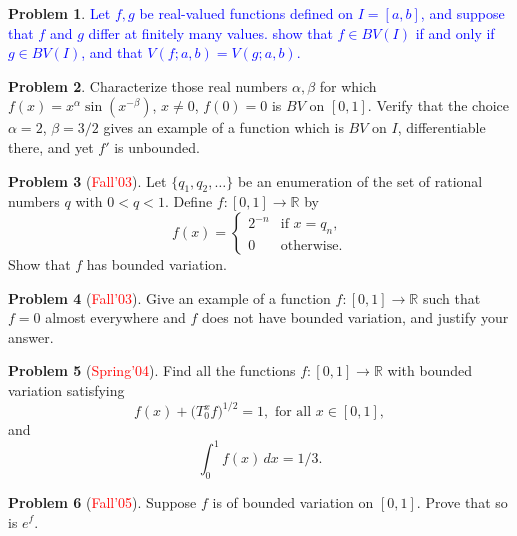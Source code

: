 \documentclass[12pt]{amsart}
\def\field#1{\mathbb{#1}}
\theoremstyle{definition}
\newtheorem{problem}{Problem}
\theoremstyle{remark}
\begin{document}
\begin{problem}
  \textcolor{blue}{Let $f,g$ be real-valued functions defined on
    $I=[a,b]$, and suppose that $f$ and $g$ differ at finitely many
    values.  show that $f \in BV(I)$ if and only if $g \in BV(I)$, and
    that $V(f;a,b) = V(g;a,b)$.}
\end{problem}
\begin{problem}
  Characterize those real numbers $\alpha, \beta$ for which $f(x) =
  x^\alpha \sin(x^{-\beta})$, $x\neq 0$, $f(0)=0$ is $BV$ on $[0,1]$.
  Verify that the choice $\alpha=2$, $\beta=3/2$ gives an example of a
  function which is $BV$ on $I$, differentiable there, and yet $f'$ is
  unbounded.
\end{problem}
\begin{problem}[\textcolor{red}{Fall'03}]
  Let $\{ q_1, q_2, \dotsc \}$ be an enumeration of the set of
  rational numbers $q$ with $0<q<1$. Define $f\colon [0,1] \to
  \field{R}$ by
  \begin{equation*}
    f(x) = \begin{cases}
      2^{-n} &\text{if } x=q_n, \\
      0 &\text{otherwise}.
    \end{cases} 
  \end{equation*}
  Show that $f$ has bounded variation.
\end{problem}
\begin{problem}[\textcolor{red}{Fall'03}]
  Give an example of a function $f\colon [0,1] \to \field{R}$ such
  that $f=0$ almost everywhere and $f$ does not have bounded
  variation, and justify your answer.
\end{problem}
\begin{problem}[\textcolor{red}{Spring'04}]
  Find all the functions $f\colon [0,1] \to \field{R}$ with bounded
  variation satisfying
  \begin{equation*}
    f(x) + \big( T_0^x f\big)^{1/2} =1, \text{ for all }x \in [0,1],
  \end{equation*}
  and
  \begin{equation*}
    \int_0^1 f(x)\, dx = 1/3.
  \end{equation*}
\end{problem}
\begin{problem}[\textcolor{red}{Fall'05}]
  Suppose $f$ is of bounded variation on $[0,1]$.  Prove that so is
  $e^f$.
\end{problem}
\end{document}
